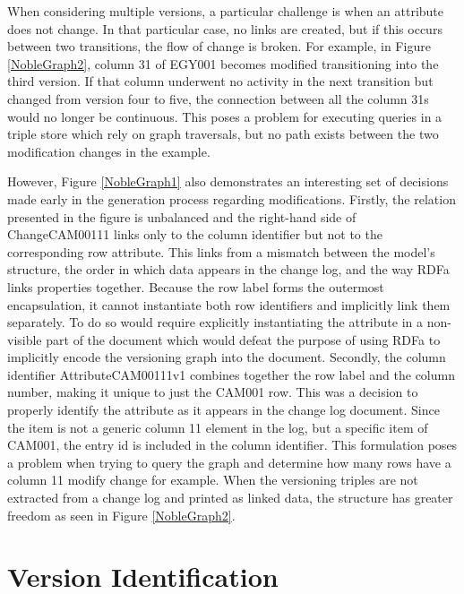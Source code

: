 When considering multiple versions, a particular challenge is when an attribute does not change.
In that particular case, no links are created, but if this occurs between two transitions, the flow of change is broken.
For example, in Figure \ref{NobleGraph2}, column 31 of EGY001 becomes modified transitioning into the third version.
If that column underwent no activity in the next transition but changed from version four to five, the connection between all the column 31s would no longer be continuous.
This poses a problem for executing queries in a triple store which rely on graph traversals, but no path exists between the two modification changes in the example.

However, Figure \ref{NobleGraph1} also demonstrates an interesting set of decisions made early in the generation process regarding modifications.
Firstly, the relation presented in the figure is unbalanced and the right-hand side of ChangeCAM00111 links only to the column identifier but not to the corresponding row attribute.
This links from a mismatch between the model's structure, the order in which data appears in the change log, and the way RDFa links properties together.
Because the row label forms the outermost encapsulation, it cannot instantiate both row identifiers and implicitly link them separately.
To do so would require explicitly instantiating the attribute in a non-visible part of the document which would defeat the purpose of using RDFa to implicitly encode the versioning graph into the document.
Secondly, the column identifier AttributeCAM00111v1 combines together the row label and the column number, making it unique to just the CAM001 row.
This was a decision to properly identify the attribute as it appears in the change log document.
Since the item is not a generic column 11 element in the log, but a specific item of CAM001, the entry id is included in the column identifier.
This formulation poses a problem when trying to query the graph and determine how many rows have a column 11 modify change for example.
When the versioning triples are not extracted from a change log and printed as linked data, the structure has greater freedom as seen in Figure \ref{NobleGraph2}.

\section{Version Identification}

